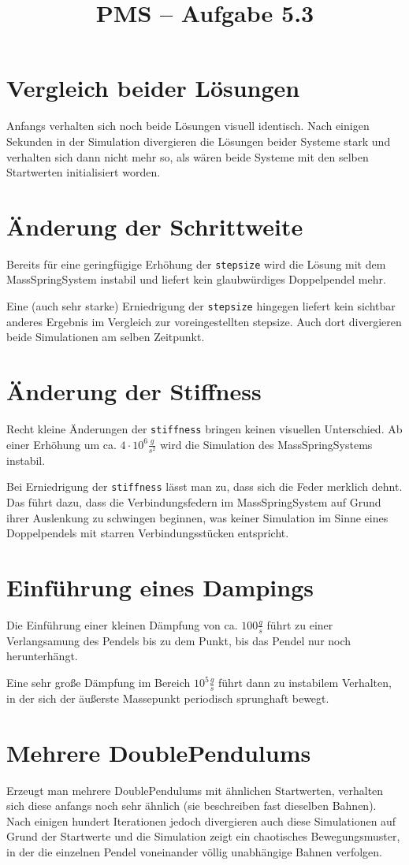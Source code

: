 \documentclass[10pt,DIV10,a4paper]{scrartcl}
\title{PMS -- Aufgabe 5.3}
\date{}
\begin{document}
\maketitle

\section*{Vergleich beider Lösungen}
Anfangs verhalten sich noch beide Lösungen visuell identisch. Nach einigen Sekunden in der Simulation divergieren die Lösungen beider Systeme stark und verhalten sich dann nicht mehr so, als wären beide Systeme mit den selben Startwerten initialisiert worden.

\section*{Änderung der Schrittweite}
Bereits für eine geringfügige Erhöhung der \texttt{stepsize} wird die Lösung mit dem MassSpringSystem instabil und liefert kein glaubwürdiges Doppelpendel mehr.

Eine (auch sehr starke) Erniedrigung der \texttt{stepsize} hingegen liefert kein sichtbar anderes Ergebnis im Vergleich zur voreingestellten stepsize. Auch dort divergieren beide Simulationen am selben Zeitpunkt.

\section*{Änderung der Stiffness}
Recht kleine Änderungen der \texttt{stiffness} bringen keinen visuellen Unterschied. Ab einer Erhöhung um ca. $4 \cdot 10^{6} \frac{g}{s^2}$ wird die Simulation des MassSpringSystems instabil.

Bei Erniedrigung der \texttt{stiffness} lässt man zu, dass sich die Feder merklich dehnt. Das führt dazu, dass die Verbindungsfedern im MassSpringSystem auf Grund ihrer Auslenkung zu schwingen beginnen, was keiner Simulation im Sinne eines Doppelpendels mit starren Verbindungsstücken entspricht.

\section*{Einführung eines Dampings}
Die Einführung einer kleinen Dämpfung von ca. $100 \frac{g}{s}$ führt zu einer Verlangsamung des Pendels bis zu dem Punkt, bis das Pendel nur noch herunterhängt.

Eine sehr große Dämpfung im Bereich $10^5 \frac{g}{s}$ führt dann zu instabilem Verhalten, in der sich der äußerste Massepunkt periodisch sprunghaft bewegt.

\section*{Mehrere DoublePendulums}
Erzeugt man mehrere DoublePendulums mit ähnlichen Startwerten, verhalten sich diese anfangs noch sehr ähnlich (sie beschreiben fast dieselben Bahnen). Nach einigen hundert Iterationen jedoch divergieren auch diese Simulationen auf Grund der Startwerte und die Simulation zeigt ein chaotisches Bewegungsmuster, in der die einzelnen Pendel voneinander völlig unabhängige Bahnen verfolgen.
\end{document}
